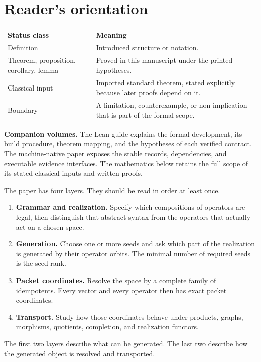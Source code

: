 \documentclass[11pt]{article}
\theoremstyle{definition}
\theoremstyle{remark}
\theoremstyle{definition}\newtheorem{example}[theorem]{Example}
\begin{document}
\clearpage
\begingroup\small{}\tableofcontents\endgroup
\clearpage

\section*{Reader's orientation}
\begin{center}
\begin{tabularx}{0.96\textwidth}{@{}lY@{}}
\toprule
\textbf{Status class} & \textbf{Meaning}\\
\midrule
Definition & Introduced structure or notation.\\
Theorem, proposition, corollary, lemma & Proved in this manuscript under the printed hypotheses.\\
Classical input & Imported standard theorem, stated explicitly because later proofs depend on it.\\
Boundary & A limitation, counterexample, or non-implication that is part of the formal scope.\\
\bottomrule
\end{tabularx}
\end{center}

\noindent\textbf{Companion volumes.} The Lean guide explains the formal development, its build procedure, theorem mapping, and the hypotheses of each verified contract. The machine-native paper exposes the stable records, dependencies, and executable evidence interfaces. The mathematics below retains the full scope of its stated classical inputs and written proofs.


\begin{readerroadmap}
The paper has four layers.  They should be read in order at least once.
\begin{enumerate}
\item \textbf{Grammar and realization.}  Specify which compositions of operators are legal, then distinguish that abstract syntax from the operators that actually act on a chosen space.
\item \textbf{Generation.}  Choose one or more seeds and ask which part of the realization is generated by their operator orbits.  The minimal number of required seeds is the seed rank.
\item \textbf{Packet coordinates.}  Resolve the space by a complete family of idempotents.  Every vector and every operator then has exact packet coordinates.
\item \textbf{Transport.}  Study how those coordinates behave under products, graphs, morphisms, quotients, completion, and realization functors.
\end{enumerate}
The first two layers describe what can be generated.  The last two describe how the generated object is resolved and transported.
\end{readerroadmap}
\end{document}
